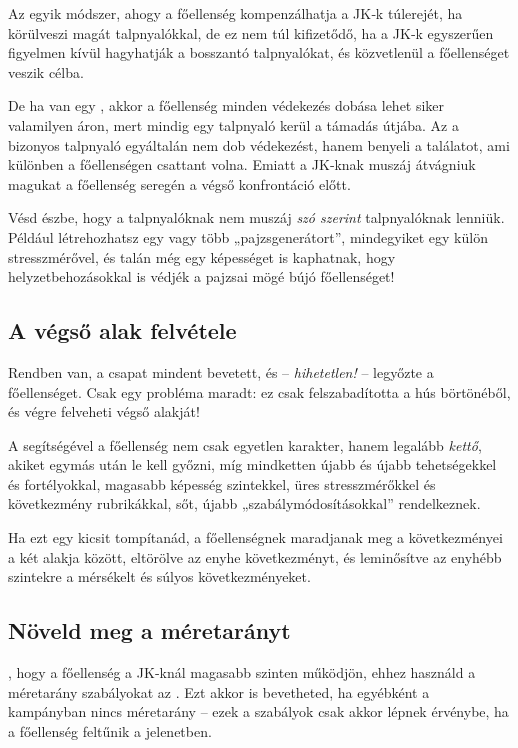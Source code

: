 Az egyik módszer, ahogy a főellenség kompenzálhatja a JK‑k túlerejét, ha körülveszi magát talpnyalókkal, de ez nem túl kifizetődő, ha a JK‑k egyszerűen figyelmen kívül hagyhatják a bosszantó talpnyalókat, és közvetlenül a főellenséget veszik célba.

De ha van egy , akkor a főellenség minden védekezés dobása lehet siker valamilyen áron, mert mindig egy talpnyaló kerül a támadás útjába. Az a bizonyos talpnyaló egyáltalán nem dob védekezést, hanem benyeli a találatot, ami különben a főellenségen csattant volna. Emiatt a JK‑knak muszáj átvágniuk magukat a főellenség seregén a végső konfrontáció előtt.

Vésd észbe, hogy a talpnyalóknak nem muszáj \emph{szó szerint} talpnyalóknak lenniük. Például létrehozhatsz egy vagy több „pajzsgenerátort”, mindegyiket egy külön stresszmérővel, és talán még egy képességet is kaphatnak, hogy helyzetbehozásokkal is védjék a pajzsai mögé bújó főellenséget!

\newpage

\subsection{A végső alak felvétele}

Rendben van, a csapat mindent bevetett, és – \emph{hihetetlen!} – legyőzte a főellenséget. Csak egy probléma maradt: ez csak felszabadította a hús börtönéből, és végre felveheti végső alakját!

A  segítségével a főellenség nem csak egyetlen karakter, hanem legalább \emph{kettő}, akiket egymás után le kell győzni, míg mindketten újabb és újabb tehetségekkel és fortélyokkal, magasabb képesség szintekkel, üres stresszmérőkkel és következmény rubrikákkal, sőt, újabb „szabálymódosításokkal” rendelkeznek.

Ha ezt egy kicsit tompítanád, a főellenségnek maradjanak meg a következményei a két alakja között, eltörölve az enyhe következményt, és leminősítve az enyhébb szintekre a mérsékelt és súlyos következményeket.

\subsection{Növeld meg a méretarányt}

, hogy a főellenség a JK‑knál magasabb szinten működjön, ehhez használd a méretarány szabályokat az . Ezt akkor is bevetheted, ha egyébként a kampányban nincs méretarány – ezek a szabályok csak akkor lépnek érvénybe, ha a főellenség feltűnik a jelenetben.

